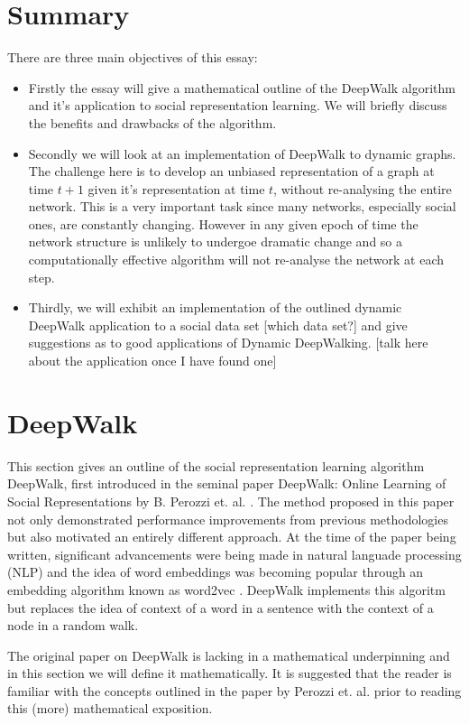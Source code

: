 \documentclass[a4paper]{article}
\begin{document}
\section{Summary}
There are three main objectives of this essay:
\begin{itemize}
  \item Firstly the essay will give a mathematical outline of the DeepWalk
    algorithm and it's application to social representation learning. We will
    briefly discuss the benefits and drawbacks of the algorithm.
  \item Secondly we will look at an implementation of DeepWalk to dynamic
    graphs. The challenge here is to develop an unbiased representation of a
    graph at time $t+1$ given it's representation at time $t$, without
    re-analysing the entire network. This is a very important task since many
    networks, especially social ones, are constantly changing. However in any given
    epoch of time the network structure is unlikely to undergoe dramatic change and
    so a computationally effective algorithm will not re-analyse the network at
    each step.
   \item Thirdly, we will exhibit an implementation of the outlined dynamic DeepWalk
     application to a social data set [which data set?] and give suggestions as
     to good applications of Dynamic DeepWalking. [talk here about the
     application once I have found one]
\end{itemize}

\section{DeepWalk}
This section gives an outline of the social representation learning algorithm
DeepWalk, first introduced in the seminal paper DeepWalk: Online Learning of Social
Representations by B. Perozzi et. al. \cite{deepwalk}. The method proposed in
this paper not only demonstrated performance improvements from previous methodologies but
also motivated an entirely different approach. At the time of the paper being
written, significant advancements were being made in natural languade processing (NLP)
and the idea of word embeddings was becoming popular through an embedding
algorithm known as word2vec \cite{mikolov2013efficient,mikolov2013distributed}.
DeepWalk implements this algoritm but replaces the idea of context of a word in
a sentence with the context of a node in a random walk.

The original paper on DeepWalk is lacking in a mathematical underpinning and in
this section we will define it mathematically. It is suggested that the reader
is familiar with the concepts outlined in the paper by Perozzi et. al. prior to
reading this (more) mathematical exposition.
\end{document}

